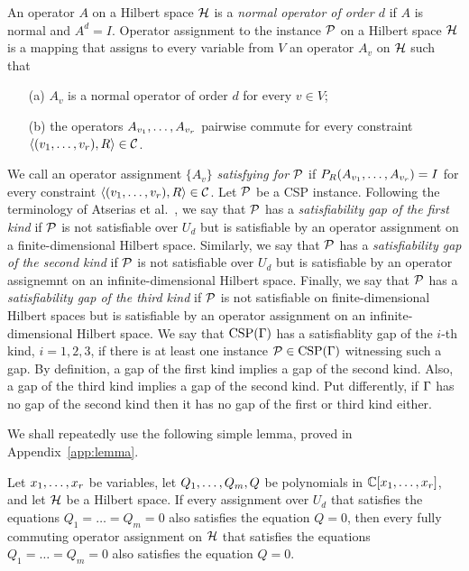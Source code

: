 \documentclass[11pt,letter]{article}
\begin{document}
An operator $A$ on a Hilbert space ${\mathcal H}$ is a \emph{normal operator of order
$d$} if $A$ is normal and $A^d=I$. Operator assignment to the instance ${\mathcal P}$ on a Hilbert space ${\mathcal H}$ is a mapping 
that assigns to every variable from $V$ an operator $A_v$ on ${\mathcal H}$ such that
\begin{itemize}
\item[(a)]
$A_v$ is a normal operator of order $d$ for every $v\in V$;
\item[(b)]
the operators $A_{v_1},\ldots, A_{v_r}$ pairwise commute
for every constraint  $\langle (v _1,\ldots, v _{r}),R \rangle\in{\mathcal C}$.
\end{itemize}

\noindent
We call an operator assignment $\{A_v\}$ \emph{satisfying for ${\mathcal P}$} if 
$P_R(A_{v_1},\ldots, A_{v_r})=I$ for every constraint $\langle (v _1,\ldots, v _{r}),R \rangle\in{\mathcal C}$.
Let ${\mathcal P}$ be a CSP instance. 
Following the terminology of Atserias et al.~\cite{AKS19:jcss}, we say that
${\mathcal P}$ has a \emph{satisfiability gap of the first kind} if ${\mathcal P}$ is not
satisfiable over $U_d$ but is satisfiable by an operator assignment on 
a finite-dimensional Hilbert space. Similarly, we say that 
${\mathcal P}$ has a \emph{satisfiability gap of the second kind} if ${\mathcal P}$ is not
satisfiable over $U_d$ but is satisfiable by an operator assignemnt on an
infinite-dimensional Hilbert space. Finally, we say that 
${\mathcal P}$ has a \emph{satisfiability gap of the third kind} if ${\mathcal P}$
is not satisfiable on finite-dimensional Hilbert spaces but is satisfiable by an
operator assignment on 
an infinite-dimensional Hilbert space.
We say that ${\rm CSP}(\Gamma)$ has a satisfiablity gap of the $i$-th
kind, $i=1,2,3$, if there is at least one instance ${\mathcal P}\in{\rm CSP}(\Gamma)$ witnessing
such a gap.
By definition, a gap of the first kind implies a gap of the second kind. Also, a
gap of the third kind implies a gap of the second kind. Put differently, if
$\Gamma$ has no gap of the second kind then it has no gap of the first or third
kind either.

We shall repeatedly use the following simple lemma, proved in Appendix~\ref{app:lemma}.

\begin{lemma}\label{lem:lemma-3}
Let $x _1,\ldots, x _{r}$ be variables, let $Q _1,\ldots, Q _{m},Q$ be polynomials in ${\mathbb C}[x _1,\ldots, x _{r}]$,
and let ${\mathcal H}$ be a Hilbert space. If every assignment over $U_d$ that 
satisfies the equations $Q_1=\dots=Q_m=0$ also satisfies the equation
$Q=0$, then every fully commuting operator assignment on ${\mathcal H}$ that 
satisfies the equations $Q_1=\dots=Q_m=0$ also satisfies the equation
$Q=0$.
\end{lemma}
\end{document}
